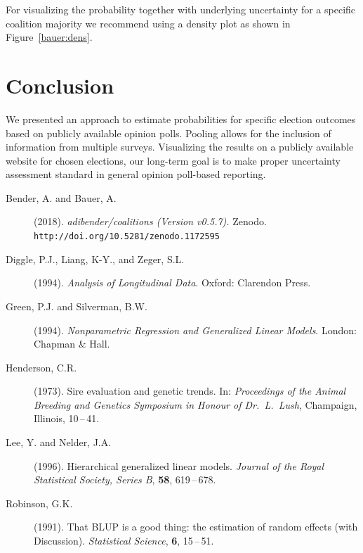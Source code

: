 \documentclass[twoside]{report}
\begin{document}
For visualizing the probability together with underlying uncertainty for a specific coalition majority we recommend using a density plot as shown in Figure~\ref{bauer:dens}.


\section{Conclusion}
We presented an approach to estimate probabilities for specific election outcomes based on publicly available opinion polls. Pooling allows for the inclusion of information from multiple surveys. Visualizing the results on a publicly available website for chosen elections, our long-term goal is to make proper uncertainty assessment standard in general opinion poll-based reporting.






\begin{description}
\item[Bender, A. and Bauer, A.] (2018).
{\it adibender/coalitions (Version v0.5.7).}
Zenodo. \texttt{http://doi.org/10.5281/zenodo.1172595}
\item[Diggle, P.J., Liang, K-Y., and Zeger, S.L.] (1994).
     {\it Analysis of Longitudinal Data}.
     Oxford: Clarendon Press.
\item[Green, P.J. and Silverman, B.W.] (1994).
     {\it Nonparametric Regression and Generalized Linear Models}.
     London: Chapman \& Hall.
\item[Henderson, C.R.] (1973).
     Sire evaluation and genetic trends.
     In: {\it Proceedings of the Animal Breeding and Genetics Symposium in
     Honour of Dr.\ L.\ Lush}, Champaign, Illinois, 10\,--\,41.
\item[Lee, Y. and Nelder, J.A.] (1996).
     Hierarchical generalized linear models.
     {\it Journal of the Royal Statistical Society, Series B}, {\bf 58},
      619\,--\,678.
\item[Robinson, G.K.] (1991).
     That BLUP is a good thing: the estimation of random effects (with Discussion).
     {\it Statistical Science}, {\bf 6}, 15\,--\,51.
\end{description}
\end{document}
